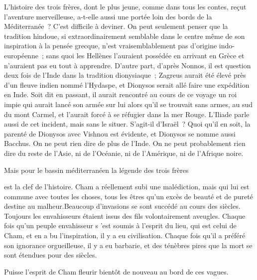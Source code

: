 \documentclass[french,twoside]{book} %
\begin{document}
L'histoire des trois frères, dont le plus jeune, comme dans tous les contes, reçut l'aventure merveilleuse, a-t-elle aussi une portée loin des bords de la Méditerranée ? C'est difficile à deviner. On peut seulement penser que la tradition hindoue, si extraordinairement semblable dans le centre même de son inspiration à la pensée grecque, n'est vraisemblablement pas d'origine indo-européenne ; sans quoi les Hellènes l'auraient possédée en arrivant en Grèce et n'auraient pas eu tout à apprendre. D'autre part, d'après Nonnos, il est question deux fois de l'Inde dans la tradition dionysiaque ; Zagreus aurait été élevé près d'un fleuve indien nommé l'Hydaspe, et Dionysos serait allé faire une expédition en Inde. Soit dit en passant, il aurait rencontré au cours de ce voyage un roi impie qui aurait lancé son armée sur lui alors qu'il se trouvait sans armes, au sud du mont Carmel, et l'aurait forcé à se réfugier dans la mer Rouge. L'Iliade parle aussi de cet incident, mais sans le situer. S'agit-il d'Israël ? Quoi qu'il en soit, la parenté de Dionysos avec Vishnou est évidente, et Dionysos se nomme aussi Bacchus. On ne peut rien dire de plus de l'Inde. On ne peut probablement rien dire du reste de l'Asie, ni de l'Océanie, ni de l'Amérique, ni de l'Afrique noire.\par
Mais pour le bassin méditerranéen la légende des trois frères\par
est la clef de l'histoire. Cham a réellement subi une malédiction, mais qui lui est commune avec toutes les choses, tous les êtres qu'un excès de beauté et de pureté destine au malheur.Beaucoup d'invasions se sont succédé au cours des siècles. Toujours les envahisseurs étaient issus des fils volontairement aveugles. Chaque fois qu'un peuple envahisseur s 'est soumis à l'esprit du lieu, qui est celui de Cham, et en a bu l'inspiration, il y a eu civilisation. Chaque fois qu'il a préféré son ignorance orgueilleuse, il y a eu barbarie, et des ténèbres pires que la mort se sont étendues pour des siècles.\par
Puisse l'esprit de Cham fleurir bientôt de nouveau au bord de ces vagues.\par
\end{document}
